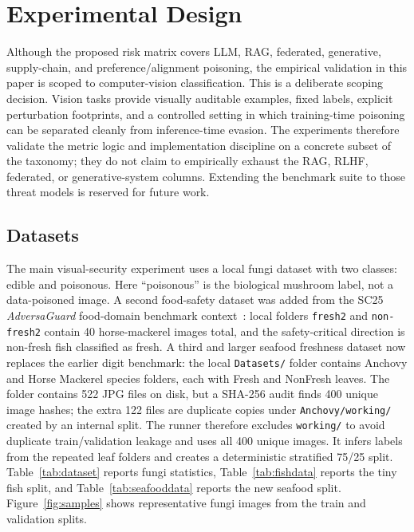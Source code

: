 \documentclass[conference]{IEEEtran}
\begin{document}
\section{Experimental Design}

Although the proposed risk matrix covers LLM, RAG, federated, generative, supply-chain, and preference/alignment poisoning, the empirical validation in this paper is scoped to computer-vision classification. This is a deliberate scoping decision. Vision tasks provide visually auditable examples, fixed labels, explicit perturbation footprints, and a controlled setting in which training-time poisoning can be separated cleanly from inference-time evasion. The experiments therefore validate the metric logic and implementation discipline on a concrete subset of the taxonomy; they do not claim to empirically exhaust the RAG, RLHF, federated, or generative-system columns. Extending the benchmark suite to those threat models is reserved for future work.

\subsection{Datasets}

The main visual-security experiment uses a local fungi dataset with two classes: edible and poisonous. Here ``poisonous'' is the biological mushroom label, not a data-poisoned image. A second food-safety dataset was added from the SC25 \emph{AdversaGuard} food-domain benchmark context~\cite{adversaguard}: local folders \texttt{fresh2} and \texttt{non-fresh2} contain 40 horse-mackerel images total, and the safety-critical direction is non-fresh fish classified as fresh. A third and larger seafood freshness dataset now replaces the earlier digit benchmark: the local \texttt{Datasets/} folder contains Anchovy and Horse Mackerel species folders, each with Fresh and NonFresh leaves. The folder contains 522 JPG files on disk, but a SHA-256 audit finds 400 unique image hashes; the extra 122 files are duplicate copies under \texttt{Anchovy/working/} created by an internal split. The runner therefore excludes \texttt{working/} to avoid duplicate train/validation leakage and uses all 400 unique images. It infers labels from the repeated leaf folders and creates a deterministic stratified 75/25 split. Table~\ref{tab:dataset} reports fungi statistics, Table~\ref{tab:fishdata} reports the tiny fish split, and Table~\ref{tab:seafooddata} reports the new seafood split. Figure~\ref{fig:samples} shows representative fungi images from the train and validation splits.
\end{document}
